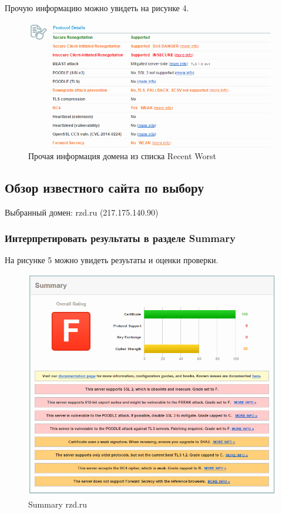 \documentclass[11pt, a4paper]{article}		%
\begin{document}
Прочую информацию можно увидеть на рисунке 4.

\begin{figure}[h!]
\centering
\includegraphics[scale=0.8]{res/info_worst_domain}
\caption{Прочая информация домена из списка Recent Worst}
\end{figure}


\subsection{Обзор известного сайта по выбору}

Выбранный домен: rzd.ru (217.175.140.90)


\subsubsection{Интерпретировать результаты в разделе Summary}

На рисунке 5 можно увидеть резуьтаты и оценки проверки.


\begin{figure}[h!]
\centering
\includegraphics[scale=0.8]{res/summary_rzd}
\caption{Summary rzd.ru}
\end{figure}
\end{document}
